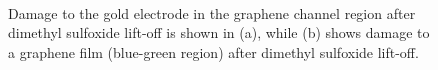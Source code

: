 \documentclass[
  a4paper,
]{scrbook}
\begin{document}
\begin{figure}
\begin{minipage}[t]{0.01\linewidth}
{~

}

\end{minipage}%
%
\begin{minipage}[t]{0.03\linewidth}

{\centering 


}

\end{minipage}%
%
\begin{minipage}[t]{0.01\linewidth}

{\centering 

~

}

\end{minipage}%
%
\begin{minipage}[t]{0.45\linewidth}

{\centering 


}

\end{minipage}%
%
\begin{minipage}[t]{0.01\linewidth}

{\centering 

~

}

\end{minipage}%

\caption{\label{fig-dmso-damage}Damage to the gold electrode in the
graphene channel region after dimethyl sulfoxide lift-off is shown in
(a), while (b) shows damage to a graphene film (blue-green region) after
dimethyl sulfoxide lift-off.}

\end{figure}
\end{document}
